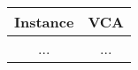 \documentclass{standalone}
\begin{document}
\begin{tabular}{||c || c||} 
    \hline
    Instance & \textbf{VCA} \\ [0.5ex] 
    \hline
    ... & ...\\
    \hline
\end{tabular}
\end{document}
